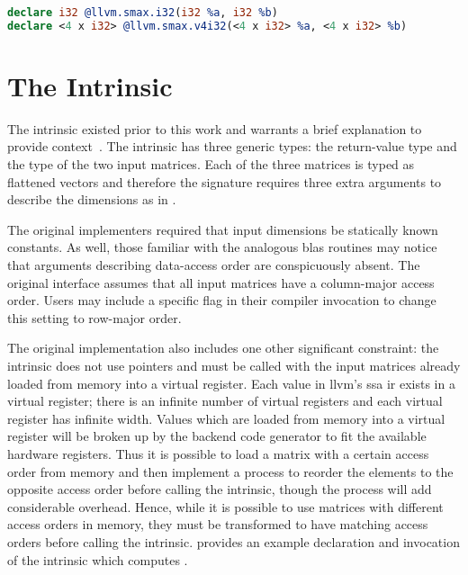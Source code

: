 \documentclass[\main/thesis.tex]{subfiles}
\begin{document}
\begin{lstlisting}[caption={[Example Intrinsic Declarations]A set of basic intrinsic declarations~\autocite{llvmLangref}.},
      label=lst:intrinsics,numbers=none,language=llvm,float,columns=flexible]
declare i32 @llvm.smax.i32(i32 %a, i32 %b)
declare <4 x i32> @llvm.smax.v4i32(<4 x i32> %a, <4 x i32> %b)
\end{lstlisting}

\section{The \texorpdfstring{}{llvm.matrix.multiply.*} Intrinsic}
\label{sec:matMulInt}
The  \gls{intrinsic} existed prior to this work and warrants a brief explanation to provide context~\autocite{llvmLangref}.
The \gls{intrinsic} has three generic types: the return-value type and the type of the two input matrices.
Each of the three matrices is typed as flattened vectors and therefore the signature requires three extra arguments to describe the dimensions as in .

The original implementers required that input dimensions be statically known constants.
As well, those familiar with the analogous \gls{blas} routines may notice that arguments describing data-access order are conspicuously absent.
The original interface assumes that all input matrices have a column-major access order.
Users may include a specific flag in their compiler invocation to change this setting to row-major order.

The original implementation also includes one other significant constraint: the \gls{intrinsic} does not use pointers and must be called with the input matrices already loaded from memory into a virtual register.
Each value in \gls{llvm}'s \gls{ssa} \gls{ir} exists in a virtual register; there is an infinite number of virtual registers and each virtual register has infinite width.
Values which are loaded from memory into a virtual register will be broken up by the backend code generator to fit the available hardware registers.
Thus it is possible to load a matrix with a certain access order from memory and then implement a process to reorder the elements to the opposite access order before calling the \gls{intrinsic}, though the process will add considerable overhead.
Hence, while it is possible to use matrices with different access orders in memory, they must be transformed to have matching access orders before calling the  \gls{intrinsic}.
 provides an example declaration and invocation of the \gls{intrinsic} which computes .
\end{document}
